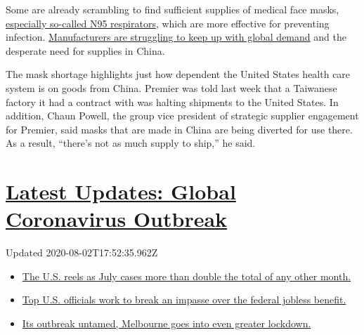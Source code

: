 Some are already scrambling to find sufficient supplies of medical face
masks,
\href{https://www.fda.gov/medical-devices/personal-protective-equipment-infection-control/masks-and-n95-respirators}{especially
so-called N95 respirators}, which are more effective for preventing
infection.
\href{https://www.nytimes.com/2020/02/06/business/coronavirus-face-masks.html?action=click\&module=Top\%20Stories\&pgtype=Homepage}{Manufacturers
are struggling to keep up with global demand} and the desperate need for
supplies in China.

The mask shortage highlights just how dependent the United States health
care system is on goods from China. Premier was told last week that a
Taiwanese factory it had a contract with was halting shipments to the
United States. In addition, Chaun Powell, the group vice president of
strategic supplier engagement for Premier, said masks that are made in
China are being diverted for use there. As a result, ``there's not as
much supply to ship,'' he said.

\hypertarget{latest-updates-global-coronavirus-outbreak}{%
\section{\texorpdfstring{\href{https://www.nytimes.com/2020/08/01/world/coronavirus-covid-19.html?action=click\&pgtype=Article\&state=default\&region=MAIN_CONTENT_1\&context=storylines_live_updates}{Latest
Updates: Global Coronavirus
Outbreak}}{Latest Updates: Global Coronavirus Outbreak}}\label{latest-updates-global-coronavirus-outbreak}}

Updated 2020-08-02T17:52:35.962Z

\begin{itemize}
\tightlist
\item
  \href{https://www.nytimes.com/2020/08/01/world/coronavirus-covid-19.html?action=click\&pgtype=Article\&state=default\&region=MAIN_CONTENT_1\&context=storylines_live_updates\#link-34047410}{The
  U.S. reels as July cases more than double the total of any other
  month.}
\item
  \href{https://www.nytimes.com/2020/08/01/world/coronavirus-covid-19.html?action=click\&pgtype=Article\&state=default\&region=MAIN_CONTENT_1\&context=storylines_live_updates\#link-780ec966}{Top
  U.S. officials work to break an impasse over the federal jobless
  benefit.}
\item
  \href{https://www.nytimes.com/2020/08/01/world/coronavirus-covid-19.html?action=click\&pgtype=Article\&state=default\&region=MAIN_CONTENT_1\&context=storylines_live_updates\#link-2bc8948}{Its
  outbreak untamed, Melbourne goes into even greater lockdown.}
\end{itemize}

